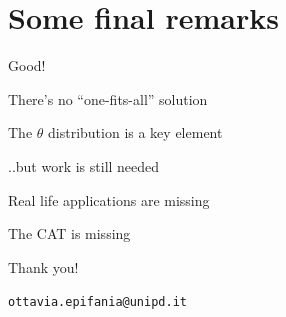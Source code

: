 \documentclass{beamer} %
\begin{document}
\section[Final remarks]{Some final remarks}

\begin{frame}


\begin{exampleblock}{Good!}
	
	There's no ``one-fits-all'' solution
	
		\vspace{2mm}
		
		 The $\theta$ distribution is a key element
\end{exampleblock}

\pause
\begin{alertblock}{..but work is still needed}
		
				\vspace{2mm}
		Real life applications are missing
		
				\vspace{2mm}
		The CAT is missing
\end{alertblock}

\end{frame}

\begin{frame}[plain]
	\vspace{2cm}
	\begin{center}
		\large{Thank you!}
		
		\vspace{3mm}
		\texttt{ottavia.epifania@unipd.it}
	\end{center}
\end{frame}
\end{document}
